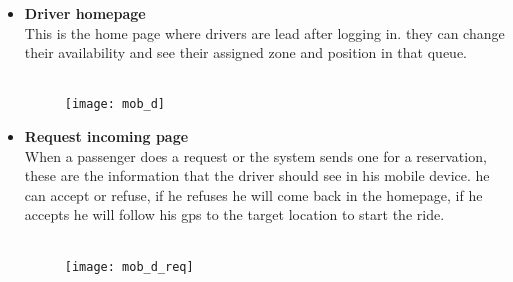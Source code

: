\begin{itemize}
	\item \textbf{Driver homepage} \\ This is the home page where drivers are lead after logging in. they can change their availability and see their assigned zone and position in that queue. \\ \\ 
	\begin{figure}[h]
		\centering	
		\texttt{[image: mob\_d]}
	\end{figure}
	\newpage
\item \textbf{Request incoming page} \\When a passenger does a request or the system sends one for a reservation, these are the information that the driver should see in his mobile device.  he can accept or refuse, if he refuses he will come back in the homepage, if he accepts he will follow his gps to the target location to start the ride.\\ \\ 
	\begin{figure}[h]
		\centering	
		\texttt{[image: mob\_d\_req]}
	\end{figure}
\end{itemize}
\newpage









